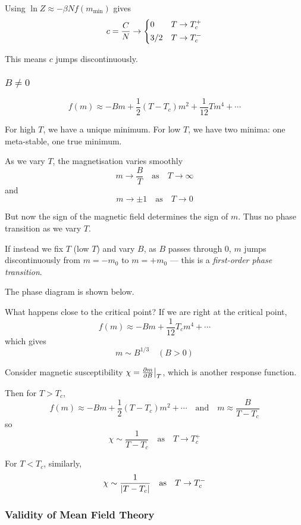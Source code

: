 \documentclass[a4paper,11pt]{article}
\begin{document}
	Using $\ln Z \approx - \beta N f(m_{\text{min}})$ gives
	\[
		c = \frac{C}{N} \to \begin{dcases}
			0 & T \to T_c^+ \\
			3/2 & T \to T_c^-
		\end{dcases}
	\]
	
	This means $c$ jumps discontinuously.
	

	\subsubsection{$B\neq 0$}
	\[
		f(m) \approx - B m + \frac{1}{2}(T - T_c)m^2 + \frac{1}{12} T m^4 + \cdots
	\]
	
	For high $T$, we have a unique minimum. For low $T$, we have two minima: one meta-stable, one true minimum.


	As we vary $T$, the magnetisation varies smoothly
	\[
		m \to \frac{B}{T} \quad \text{as} \quad T \to \infty
	\]
	and
	\[
		m \to \pm 1 \quad \text{as} \quad T \to 0
	\]
	
	But now the sign of the magnetic field determines the sign of $m$. Thus no phase transition as we vary $T$.


	If instead we fix $T$ (low $T$) and vary $B$, as $B$ passes through $0$, $m$ jumps discontinuously from $m = - m_0$ to $m = + m_0$ --- this is a \emph{first-order phase transition}.


	The phase diagram is shown below.


	What happens close to the critical point? If we are right at the critical point, 
	\[
		f(m) \approx - B m + \frac{1}{12}T_c m^4 + \cdots
	\]
	which gives
	\[
		m \sim B^{1/3} \quad (B > 0)
	\]
	
	Consider magnetic susceptibility $\chi = \pdv{m}{B}\big|_T$, which is another response function. 
	
	Then for $T>T_c$, 
	\[
		f(m) \approx -B m + \frac{1}{2} (T- T_c)m^2 + \cdots \quad \text{and} \quad m \approx \frac{B}{T - T_c}
	\]
	so
	\[
		\chi \sim \frac{1}{T - T_c} \quad \text{as} \quad T \to T_c^+
	\]
	
	For $T<T_c$, similarly,
	\[
		\chi \sim \frac{1}{\abs{T - T_c}} \quad \text{as} \quad T \to T_c^-
	\]

	\subsubsection{Validity of Mean Field Theory} 
\end{document}
